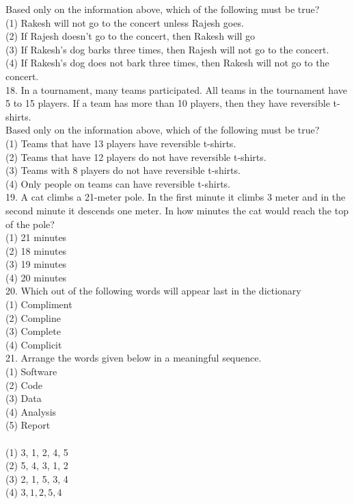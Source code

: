 \documentclass[10pt]{article}
\begin{document}
Based only on the information above, which of the following must be true?\\
(1) Rakesh will not go to the concert unless Rajesh goes.\\
(2) If Rajesh doesn't go to the concert, then Rakesh will go\\
(3) If Rakesh's dog barks three times, then Rajesh will not go to the concert.\\
(4) If Rakesh's dog does not bark three times, then Rakesh will not go to the concert.\\
18. In a tournament, many teams participated. All teams in the tournament have 5 to 15 players. If a team has more than 10 players, then they have reversible t-shirts.\\
Based only on the information above, which of the following must be true?\\
(1) Teams that have 13 players have reversible t-shirts.\\
(2) Teams that have 12 players do not have reversible t-shirts.\\
(3) Teams with 8 players do not have reversible t-shirts.\\
(4) Only people on teams can have reversible t-shirts.\\
19. A cat climbs a 21-meter pole. In the first minute it climbs 3 meter and in the second minute it descends one meter. In how minutes the cat would reach the top of the pole?\\
(1) 21 minutes\\
(2) 18 minutes\\
(3) 19 minutes\\
(4) 20 minutes\\
20. Which out of the following words will appear last in the dictionary\\
(1) Compliment\\
(2) Compline\\
(3) Complete\\
(4) Complicit\\
21. Arrange the words given below in a meaningful sequence.\\
(1) Software\\
(2) Code\\
(3) Data\\
(4) Analysis\\
(5) Report\\
\\
(1) 3, 1, 2, 4, 5\\
(2) 5, 4, 3, 1, 2\\
(3) 2, 1, 5, 3, 4\\
(4) $3,1,2,5,4$\\
\end{document}
